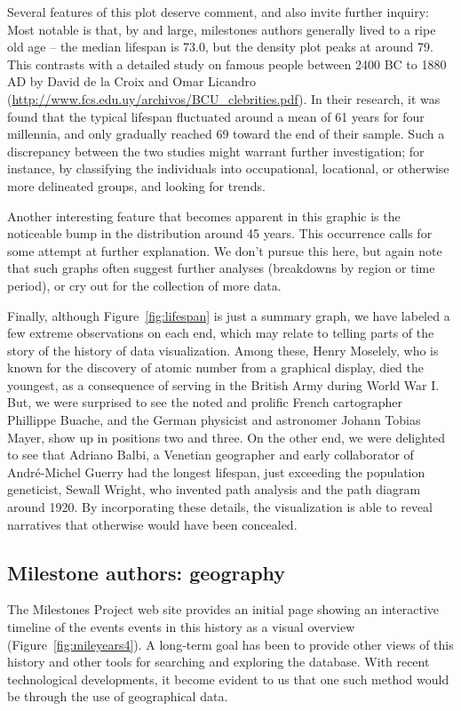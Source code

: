 \documentclass[11pt]{article}
\newcommand*{\figref}[1]{Figure~\ref{#1}}
\begin{document}
Several features of this plot deserve comment, and also invite further inquiry: Most notable is that, by and large, milestones authors generally lived to a ripe old age -- the median lifespan is 73.0, but the density plot peaks at around 79. This contrasts with a detailed study on famous people between 2400 BC to 1880 AD by David de la Croix and Omar Licandro (\url{http://www.fcs.edu.uy/archivos/BCU_clebrities.pdf}).  In their research, it was found that the typical lifespan fluctuated around a mean of 61 years for four millennia, and only gradually reached 69 toward the end of their sample. Such a discrepancy between the two studies might warrant further investigation; for instance, by classifying the individuals into occupational, locational, or otherwise more delineated groups, and looking for trends.

Another interesting feature that becomes apparent in this graphic is the noticeable bump in the distribution around 45 years. This occurrence calls for some attempt at further explanation. We don't pursue this here, but again note that such graphs often suggest further analyses (breakdowns by region or time period), or cry out for the collection of more data.

Finally, although \figref{fig:lifespan} is just a summary graph, we have labeled a few extreme observations on each end, which may relate to telling parts of the story of the history of data visualization.  Among these, Henry Moselely, who is known for the discovery of atomic number from a graphical display, died the youngest, as a consequence of serving in the British Army during World War I. But, we were surprised to see the noted and prolific French cartographer Phillippe Buache, and the German physicist and astronomer Johann Tobias Mayer, show up in positions two and three.  On the other end, we were delighted to see that Adriano Balbi, a Venetian geographer and early collaborator of Andr{\'e}-Michel Guerry \citep{BalbiGuerry:1829} had the longest lifespan, just exceeding the population geneticist, Sewall Wright, who invented path analysis and the path diagram around 1920.  By incorporating these details, the visualization is able to reveal narratives that otherwise would have been concealed.

\subsection{Milestone authors: geography}\label{sec:geography}
The Milestones Project web site provides an initial page showing an interactive timeline of the events events in this history as a visual overview (\figref{fig:mileyears4}). A long-term goal has been to provide other views of this history and other tools for searching and exploring the database. With recent technological developments, it become evident to us that one such method would be through the use of geographical data.
\end{document}
